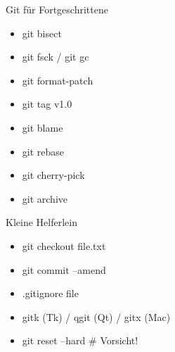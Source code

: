 \documentclass{beamer}
\begin{document}
\begin{frame}{Git für Fortgeschrittene}{}

  \begin{itemize}
    \item git bisect
    \item git fsck / git gc
    \item git format-patch
    \item git tag v1.0
    \item git blame
    \item git rebase
    \item git cherry-pick
    \item git archive
  \end{itemize}

\end{frame}

\begin{frame}{Kleine Helferlein}{}

  \begin{itemize}
    \item git checkout file.txt
    \item git commit --amend
    \item .gitignore file
    \item gitk (Tk) / qgit (Qt) / gitx (Mac)
    \item git reset --hard \# Vorsicht!
  \end{itemize}

\end{frame}
\end{document}
